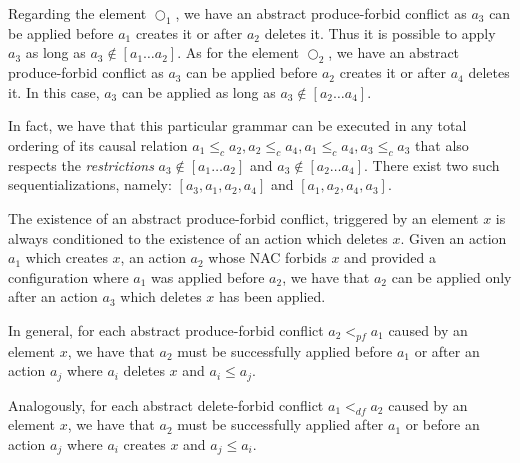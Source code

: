 \begin{example}
  Regarding the element $\Circle_1$, we have an abstract produce-forbid conflict as $a_3$ can be applied before $a_1$ creates it or after $a_2$ deletes it. Thus it is possible to apply $a_3$ as long as $a_3 \not\in [a_1\ldots a_2]$. As for the element $\Circle_2$, we have an abstract produce-forbid conflict as $a_3$ can be applied before $a_2$ creates it or after $a_4$ deletes it. In this case, $a_3$ can be applied as long as $a_3 \not\in [a_2\ldots a_4]$.

  In fact, we have that this particular grammar can be executed in any total ordering of its causal relation $a_1 \leq_c a_2, a_2 \leq_c a_4, a_1 \leq_c a_4, a_3 \leq_c a_3$ that also respects the \emph{restrictions} $a_3 \not\in [a_1\ldots a_2]$ and $a_3 \not\in [a_2\ldots a_4]$. There exist two such sequentializations, namely: $[a_3, a_1, a_2, a_4]$ and $[a_1,a_2,a_4,a_3]$.
\end{example}

\begin{remark} The existence of an abstract produce-forbid conflict, triggered by an element $x$ is always conditioned to the existence of an action which deletes $x$. Given an action $a_1$ which creates $x$, an action $a_2$ whose NAC forbids $x$ and provided a configuration where $a_1$ was applied before $a_2$, we have that $a_2$ can be applied only after an action $a_3$ which deletes $x$ has been applied.

  In general, for each abstract produce-forbid conflict $a_2 <_{pf} a_1$ caused by an element $x$, we have that $a_2$ must be successfully applied before $a_1$ or after an action $a_{j}$ where $a_i$ deletes $x$ and $a_i \leq a_j$.

  Analogously, for each abstract delete-forbid conflict $a_1 <_{df} a_2$ caused by an element $x$, we have that $a_2$ must be successfully applied after $a_1$ or before an action $a_j$ where $a_i$ creates $x$ and $a_j \leq a_i$.
\end{remark}


